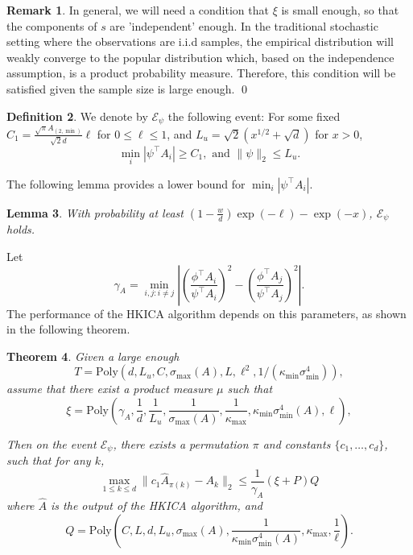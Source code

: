 \documentclass[twoside]{article}
\newcommand{\Epsi}{\mathcal{E}_{\psi}}
\newtheorem{lemma}{Lemma}[section]
\newtheorem{thm}[lemma]{Theorem}
\theoremstyle{definition}
\newtheorem{definition}[lemma]{Definition}
\newtheorem{remark}[lemma]{Remark}
\begin{document}
\begin{remark}
\label{rmk:xi}
In general, we will need a condition that $\xi$ is small enough, so that the components of $s$ are 'independent' enough.
In the traditional stochastic setting where the observations are i.i.d samples, the empirical distribution will weakly converge to the popular distribution which, based on the independence assumption, is a product probability measure. 
Therefore, this condition will be satisfied given the sample size is large enough. \qed
\end{remark} 

\begin{definition}
We denote by $\Epsi$ the following event: For some fixed $C_1 = \frac{\sqrt{\pi}A_{(2,\min)}}{\sqrt{2}d} \ell$ for $0\le \ell\le 1$, and $ L_u = \sqrt{2}\left(x^{1/2}+\sqrt{d}\right)$ for $x>0$,
\[\min_i |\psi^{\top}A_i| \ge C_1, \text{ and } \|\psi\|_2 \le L_u.\] 
\end{definition}
The following lemma provides a lower bound for $\min_i |\psi^{\top}A_i|$.
\begin{lemma}
\label{lem:dmin}
With probability at least $\left(1- \frac{w}{d}\right)\exp(-\ell) - \exp(-x)$, $\Epsi$ holds.
\end{lemma}
Let 
\begin{equation}
\label{def:kappa}
\gamma_A =  \min_{i,j: i\neq j} \left\vert \left(\frac{\phi^{\top}A_i}{\psi^{\top}A_i}\right)^2 - \left(\frac{\phi^{\top}A_j}{\psi^{\top}A_j}\right)^2 \right\vert. 
\end{equation}
The performance of the HKICA algorithm depends on this parameters, as shown in the following theorem.
\begin{thm}
 \label{thm:efficiency} 
Given a large enough 
\[T = \text{Poly}(d, L_u, C, \sigma_{\max}(A), L, \ell^2, 1/(\kappa_{\min}\sigma_{\min}^4)),\]
assume that there exist a product measure $\mu$ such that 
\[\xi=\text{Poly}(\gamma_A, \frac{1}{d}, \frac{1}{L_u}, \frac{1}{\sigma_{\max}(A)}, \frac{1}{\kappa_{\max}}, \kappa_{\min}\sigma^4_{\min}(A), \ell),\] 

 Then on the event $\Epsi$, there exists a permutation $\pi$ and constants $\{c_1,\ldots,c_d\}$, such that for any $k$,
 \[
  \max_{1\le k\le d}\| c_1\widehat{A}_{\pi(k)} - A_k\|_2 \le
  \frac{1}{\gamma_A} (\xi + P)Q
\]
where $\widehat{A}$ is the output of the HKICA algorithm, and \[Q=\text{Poly}(C, L, d, L_u, \sigma_{\max}(A), \frac{1}{\kappa_{\min}\sigma^4_{\min}(A)}, \kappa_{\max}, \frac{1}{\ell}).\]
 \end{thm}
\end{document}
